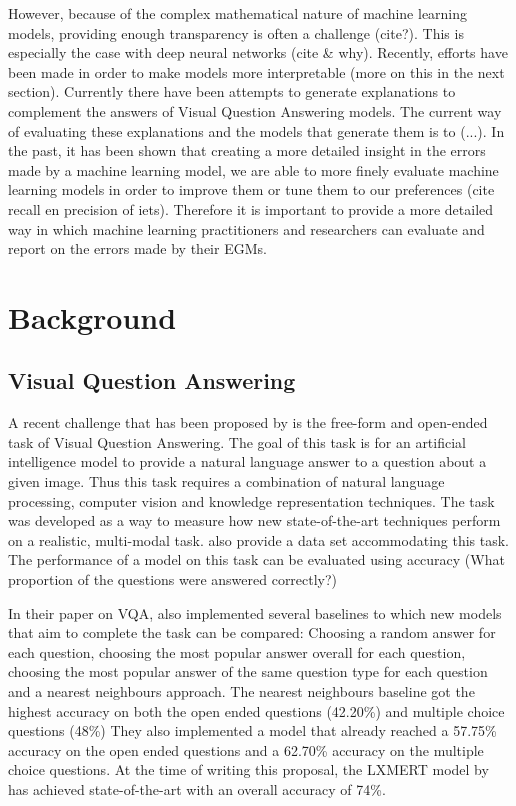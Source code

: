 However, because of the complex mathematical nature of machine learning models, providing enough transparency is often a challenge (cite?). This is especially the case with deep neural networks (cite \& why). Recently, efforts have been made in order to make models more interpretable (more on this in the next section). Currently there have been attempts to generate explanations to complement the answers of Visual Question Answering models. The current way of evaluating these explanations and the models that generate them is to (...). In the past, it has been shown that creating a more detailed insight in the errors made by a machine learning model, we are able to more finely evaluate machine learning models in order to improve them or tune them to our preferences (cite recall en precision of iets). Therefore it is important to provide a more detailed way in which machine learning practitioners and researchers can evaluate and report on the errors made by their EGMs. 

\section{Background}



\subsection{Visual Question Answering}

A recent challenge that has been proposed by  is the free-form and open-ended task of Visual Question Answering. The goal of this task is for an artificial intelligence model to provide a natural language answer to a question about a given image. Thus this task requires a combination of natural language processing, computer vision and knowledge representation techniques.%
The task was developed as a way to measure how new state-of-the-art techniques perform on a realistic, multi-modal task.  also provide a data set accommodating this task. The performance of a model on this task can be evaluated using accuracy (What proportion of the questions were answered correctly?)

In their paper on VQA,  also implemented several baselines to which new models that aim to complete the task can be compared: Choosing a random answer for each question, choosing the most popular answer overall for each question, choosing the most popular answer of the same question type for each question and a nearest neighbours approach. The nearest neighbours baseline got the highest accuracy on both the open ended questions (42.20\%) and multiple choice questions (48\%) They also implemented a model that already reached a 57.75\% accuracy on the open ended questions and a 62.70\% accuracy on the multiple choice questions. At the time of writing this proposal, the LXMERT model by  has achieved state-of-the-art with an overall accuracy of 74\%.%


